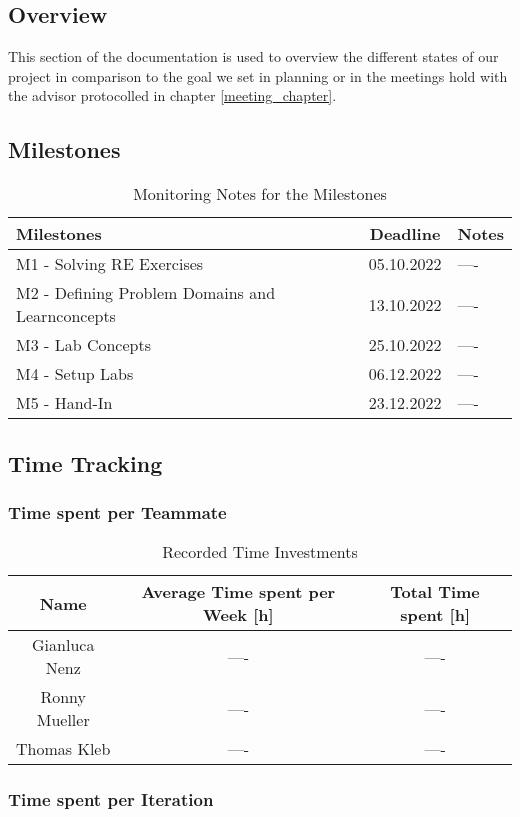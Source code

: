 \subsection{Overview}
This section of the documentation is used to overview the different states of our project in comparison to the goal we set in planning or in the meetings hold with the advisor protocolled in chapter \ref*{meeting_chapter}.

\subsection{Milestones}

\begin{table}[H]
    \centering
    \begin{tabular}[]{|| p{5cm} | c | p{6.2cm} ||}
        \hline
        Milestones & Deadline & Notes \\
        \hline \hline
        M1 - Solving RE Exercises & 05.10.2022 & ---- \\
        \hline
        M2 - Defining Problem Domains and Learnconcepts& 13.10.2022 & ---- \\
        \hline
        M3 - Lab Concepts & 25.10.2022 & ---- \\
        \hline
        M4 - Setup Labs & 06.12.2022 & ---- \\
        \hline
        M5 - Hand-In & 23.12.2022 & ---- \\
        \hline
    \end{tabular}
    \caption{Monitoring Notes for the Milestones}
    \label{milestones_monitoring_table}
\end{table}

\subsection{Time Tracking}

\subsubsection*{Time spent per Teammate}
\begin{table}[H]
    \centering
    \begin{tabular}{||c c c||} 
        \hline
        Name & Average Time spent per Week [h] & Total Time spent [h]\\ [0.5ex] 
        \hline\hline
        Gianluca Nenz &  ---- & ---- \\ 
        \hline
        Ronny Mueller &  ---- & ---- \\
        \hline
        Thomas Kleb & ---- & ---- \\ 
        \hline
    \end{tabular}
    \caption{Recorded Time Investments}
    \label{time_ects_recorded}
\end{table}

\subsubsection*{Time spent per Iteration}
